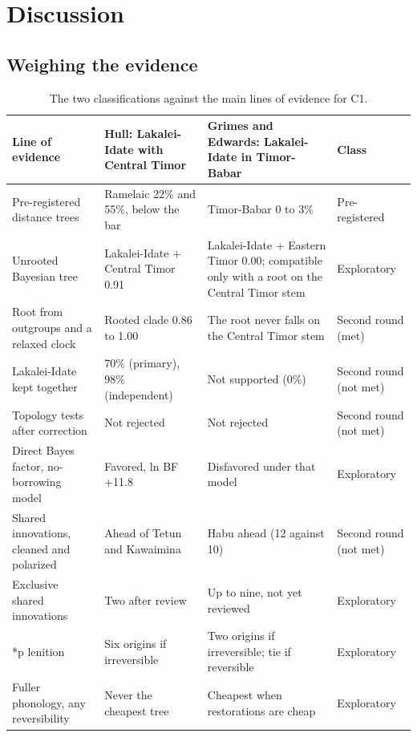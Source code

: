 \documentclass[11pt]{article}
\newcommand{\hd}[1]{\begin{minipage}[b]{\linewidth}\raggedright #1\end{minipage}}
\begin{document}
\section{Discussion}

\subsection{Weighing the evidence}

\begin{table}[tbp]
\caption{The two classifications against the main lines of evidence for
C1.}
\label{tab:weighing}
\begin{tabularx}{\linewidth}{@{}L{1}L{1.08}L{1.2}L{0.72}@{}}
\toprule
\hd{Line of evidence} & \hd{Hull: Lakalei-Idate with Central Timor} & \hd{Grimes and Edwards: Lakalei-Idate in Timor-Babar} & \hd{Class} \\
\midrule
Pre-registered distance trees & Ramelaic 22\% and 55\%, below the bar & Timor-Babar 0 to 3\% & Pre-registered \\
Unrooted Bayesian tree & Lakalei-Idate + Central Timor 0.91 & Lakalei-Idate + Eastern Timor 0.00; compatible only with a root on the Central Timor stem & Exploratory \\
Root from outgroups and a relaxed clock & Rooted clade 0.86 to 1.00 & The root never falls on the Central Timor stem & Second round (met) \\
Lakalei-Idate kept together & 70\% (primary), 98\% (independent) & Not supported (0\%) & Second round (not met) \\
Topology tests after correction & Not rejected & Not rejected & Second round (not met) \\
Direct Bayes factor, no-borrowing model & Favored, ln BF +11.8 & Disfavored under that model & Exploratory \\
Shared innovations, cleaned and polarized & Ahead of Tetun and Kawaimina & Habu ahead (12 against 10) & Second round (not met) \\
Exclusive shared innovations & Two after review & Up to nine, not yet reviewed & Exploratory \\
*p lenition & Six origins if irreversible & Two origins if irreversible; tie if reversible & Exploratory \\
Fuller phonology, any reversibility & Never the cheapest tree & Cheapest when restorations are cheap & Exploratory \\
\bottomrule
\end{tabularx}
\end{table}
\end{document}
